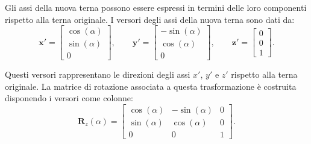 \documentclass[11pt, a4paper]{report}
\begin{document}
\begin{center}
    \qquad\qquad
\end{center}

Gli assi della nuova terna possono essere espressi in termini delle loro componenti rispetto alla terna originale. I versori degli assi della nuova terna sono dati da:
\[
\mathbf{x}' =
\begin{bmatrix}
    \cos(\alpha) \\
    \sin(\alpha) \\
    0
\end{bmatrix},
\qquad
\mathbf{y}' =
\begin{bmatrix}
    -\sin(\alpha) \\
    \cos(\alpha) \\
    0
\end{bmatrix},
\qquad
\mathbf{z}' =
\begin{bmatrix}
    0 \\
    0 \\
    1
\end{bmatrix}.
\]

Questi versori rappresentano le direzioni degli assi $x'$, $y'$ e $z'$ rispetto alla terna originale. La matrice di rotazione associata a questa trasformazione è costruita disponendo i versori come colonne:
\[
\mathbf{R}_{z}(\alpha) =
\begin{bmatrix}
    \cos(\alpha) & -\sin(\alpha) & 0 \\
    \sin(\alpha) & \cos(\alpha) & 0 \\
    0 & 0 & 1
\end{bmatrix}.
\]
\end{document}
